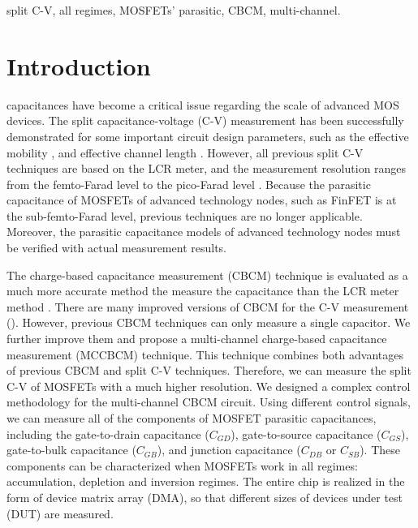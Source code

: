\documentclass[journal]{IEEEtran}
\begin{document}
\begin{IEEEkeywords}
split C-V, all regimes, MOSFETs' parasitic, CBCM, multi-channel.
\end{IEEEkeywords}





\IEEEpeerreviewmaketitle


\section{Introduction}

 capacitances have become a critical issue regarding the scale of advanced MOS devices. The split capacitance-voltage (C-V) measurement has been successfully demonstrated for some important circuit design parameters, such as the effective mobility \cite{1}, and effective channel length \cite{2}. However, all previous split C-V techniques are based on the LCR meter, and the measurement resolution ranges from the femto-Farad level to the pico-Farad level \cite{1,2,3,4,5}. Because the parasitic capacitance of MOSFETs of advanced technology nodes, such as FinFET is at the sub-femto-Farad level, previous techniques are no longer applicable. Moreover, the parasitic capacitance models of advanced technology nodes \cite{6} must be verified with actual measurement results.

The charge-based capacitance measurement (CBCM) technique is evaluated as a much more accurate method the measure the capacitance than the LCR meter method \cite{7}. There are many improved versions of CBCM for the C-V measurement (\cite{8,9,10}). However, previous CBCM techniques can only measure a single capacitor. We further improve them and propose a multi-channel charge-based capacitance measurement (MCCBCM) technique. This technique combines both advantages of previous CBCM and split C-V techniques. Therefore, we can measure the split C-V of MOSFETs with a much higher resolution. We designed a complex control methodology for the multi-channel CBCM circuit. Using different control signals, we can measure all of the components of MOSFET parasitic capacitances, including the gate-to-drain capacitance ($C_{GD}$), gate-to-source capacitance ($C_{GS}$), gate-to-bulk capacitance ($C_{GB}$), and junction capacitance ($C_{DB}$ or $C_{SB}$). These components can be characterized when MOSFETs work in all regimes: accumulation, depletion and inversion regimes. The entire chip is realized in the form of device matrix array (DMA), so that different sizes of devices under test (DUT) are measured. 
\end{document}
